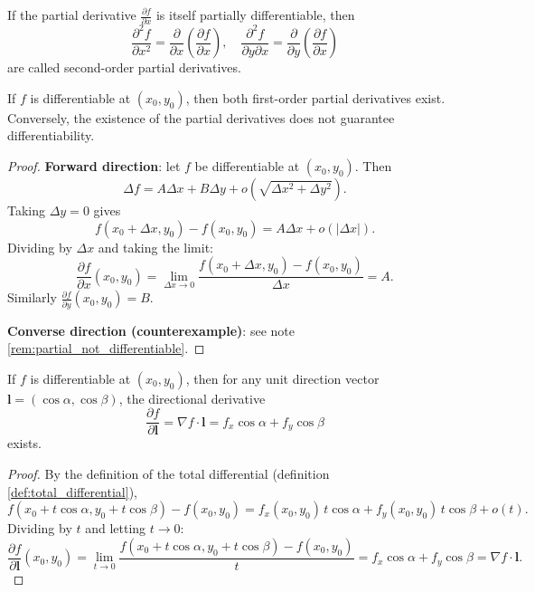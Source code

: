 \begin{definition}\label{def:higher_partial}
If the partial derivative $\frac{\partial f}{\partial x}$ is itself partially differentiable, then
\[\frac{\partial^2 f}{\partial x^2} = \frac{\partial}{\partial x}\left(\frac{\partial f}{\partial x}\right),\quad
\frac{\partial^2 f}{\partial y \partial x} = \frac{\partial}{\partial y}\left(\frac{\partial f}{\partial x}\right)\]
are called second-order partial derivatives.
\end{definition}

\begin{proposition}\label{prop:diff_partial}
If $f$ is differentiable at $(x_0, y_0)$, then both first-order partial derivatives exist. Conversely, the existence of the partial derivatives does not guarantee differentiability.
\end{proposition}

\begin{proof}
\textbf{Forward direction}: let $f$ be differentiable at $(x_0, y_0)$. Then
\[
\Delta f = A\Delta x + B\Delta y + o\!\left(\sqrt{\Delta x^2 + \Delta y^2}\right).
\]
Taking $\Delta y = 0$ gives
\[
f(x_0 + \Delta x, y_0) - f(x_0, y_0) = A\Delta x + o(|\Delta x|).
\]
Dividing by $\Delta x$ and taking the limit:
\[
\frac{\partial f}{\partial x}(x_0, y_0) = \lim_{\Delta x \to 0} \frac{f(x_0+\Delta x, y_0) - f(x_0, y_0)}{\Delta x} = A.
\]
Similarly $\frac{\partial f}{\partial y}(x_0, y_0) = B$.

\textbf{Converse direction (counterexample)}: see note \ref{rem:partial_not_differentiable}.
\end{proof}

\begin{lemma}\label{lem:directional_derivative}
If $f$ is differentiable at $(x_0, y_0)$, then for any unit direction vector $\boldsymbol{l} = (\cos\alpha, \cos\beta)$, the directional derivative
\[\frac{\partial f}{\partial \boldsymbol{l}} = \nabla f \cdot \boldsymbol{l} = f_x \cos\alpha + f_y \cos\beta\]
exists.
\end{lemma}

\begin{proof}
By the definition of the total differential (definition \ref{def:total_differential}),
\[
f(x_0 + t\cos\alpha, y_0 + t\cos\beta) - f(x_0, y_0) = f_x(x_0,y_0)\,t\cos\alpha + f_y(x_0,y_0)\,t\cos\beta + o(t).
\]
Dividing by $t$ and letting $t \to 0$:
\[
\frac{\partial f}{\partial \boldsymbol{l}}(x_0, y_0) = \lim_{t \to 0} \frac{f(x_0 + t\cos\alpha, y_0 + t\cos\beta) - f(x_0, y_0)}{t} = f_x \cos\alpha + f_y \cos\beta = \nabla f \cdot \boldsymbol{l}.
\]
\end{proof}


